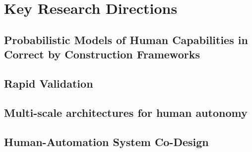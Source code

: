 
\section*{Key Research Directions}

\subsection*{Probabilistic Models of Human Capabilities in Correct by Construction Frameworks}


\subsection*{Rapid Validation}


\subsection*{Multi-scale architectures for human autonomy}


\subsection*{Human-Automation System Co-Design}


